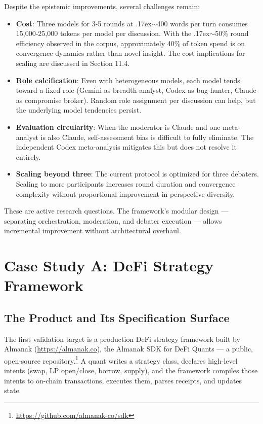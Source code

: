 \documentclass[11pt,a4paper]{article}
\newcommand{\roughly}{{\textraisebox{.17ex}{$\scriptstyle\sim$}}}
\newcommand{\textraisebox}[2]{\leavevmode\raise#1\hbox{#2}}
\begin{document}
Despite the epistemic improvements, several challenges remain:

\begin{itemize}
\item
  \textbf{Cost}: Three models for 3-5 rounds at \roughly400 words per turn consumes 15,000-25,000 tokens per model per discussion. With the \roughly50\% round efficiency observed in the corpus, approximately 40\% of token spend is on convergence dynamics rather than novel insight. The cost implications for scaling are discussed in Section 11.4.
\item
  \textbf{Role calcification}: Even with heterogeneous models, each model tends toward a fixed role (Gemini as breadth analyst, Codex as bug hunter, Claude as compromise broker). Random role assignment per discussion can help, but the underlying model tendencies persist.
\item
  \textbf{Evaluation circularity}: When the moderator is Claude and one meta-analyst is also Claude, self-assessment bias is difficult to fully eliminate. The independent Codex meta-analysis mitigates this but does not resolve it entirely.
\item
  \textbf{Scaling beyond three}: The current protocol is optimized for three debaters. Scaling to more participants increases round duration and convergence complexity without proportional improvement in perspective diversity.
\end{itemize}

These are active research questions. The framework's modular design --- separating orchestration, moderation, and debater execution --- allows incremental improvement without architectural overhaul.


\clearpage
\section{Case Study A: DeFi Strategy Framework}\label{sec:case-study-a-defi-strategy-framework}

\subsection{The Product and Its Specification Surface}\label{sec:product-and-its-specification-surface}

The first validation target is a production DeFi strategy framework built by Almanak (\url{https://almanak.co}), the Almanak SDK for DeFi Quants --- a public, open-source repository.\footnote{\url{https://github.com/almanak-co/sdk}} A quant writes a strategy class, declares high-level intents (swap, LP open/close, borrow, supply), and the framework compiles those intents to on-chain transactions, executes them, parses receipts, and updates state.
\end{document}
